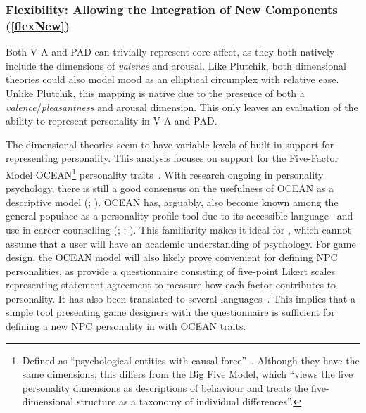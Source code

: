 \subsubsection{Flexibility: Allowing the Integration of New Components
(\ref{flexNew})}
Both V-A and PAD can trivially represent core affect, as they both natively
include the dimensions of \textit{valence} and arousal. Like Plutchik, both
dimensional theories could also model mood as an elliptical circumplex with
relative ease. Unlike Plutchik, this mapping is native due to the presence of
both a \textit{valence}/\textit{pleasantness} and arousal dimension. This only
leaves an evaluation of the ability to represent personality in V-A and PAD.

The dimensional theories seem to have variable levels of built-in support for
representing personality. This analysis focuses on support for the Five-Factor
Model OCEAN\footnote{Defined as ``psychological entities with causal
    force''~\citep{ffmdef}. Although they have the same dimensions, this differs
    from the Big Five Model, which ``views the five personality dimensions as
    descriptions of behaviour and treats the five-dimensional structure as a
    taxonomy of individual differences''.} personality
traits~\citep{costa1992normal}. With research ongoing in personality
psychology, there is still a good consensus on the usefulness of OCEAN as a
descriptive model (;
). OCEAN has, arguably, also become known among the
general populace as a personality profile tool due to its accessible
language~\citep[p.~1]{raad2002big} and use in career counselling
(; ;
). This familiarity makes it ideal for
\progname{}, which cannot assume that a user will have an academic
understanding of psychology. For game design, the OCEAN model will also likely
prove convenient for defining NPC personalities, as \citet{costa1992normal}
provide a questionnaire consisting of five-point Likert scales representing
statement agreement to measure how each factor contributes to personality. It
has also been translated to several languages~\citep[p.~84]{yik2002relating}.
This implies that a simple tool presenting game designers with the
questionnaire is sufficient for defining a new NPC personality in \progname{}
with OCEAN traits.

